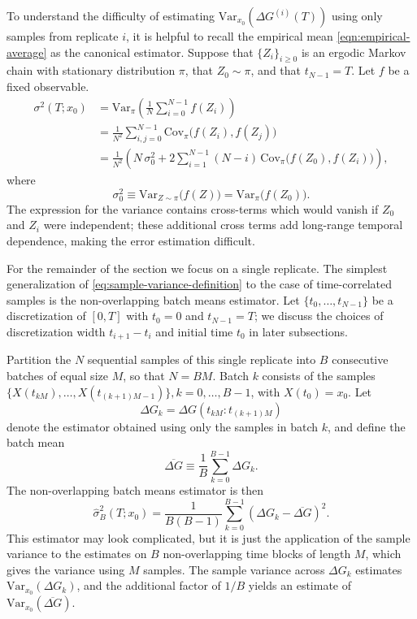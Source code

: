 \documentclass[9pt,bestpractices]{livecoms}
\begin{document}
To understand the difficulty of estimating $\mathrm{Var}_{x_0}(\Delta G^{(i)}(T))$ using only samples from replicate $i$, it is helpful to recall the empirical mean \eqref{eqn:empirical-average} as the canonical estimator. Suppose that $\{Z_i\}_{i\ge 0}$ is an ergodic Markov chain with stationary distribution $\pi$, that $Z_0 \sim \pi$, and that $t_{N-1}=T$. Let $f$ be a fixed observable. 
\begin{align}
\sigma^2(T;x_0) &= \mathrm{Var}_{\pi}\!\left(\frac{1}{N}\sum_{i=0}^{N-1} f(Z_i) \right) \\
&= \frac{1}{N^2}\sum_{i,j=0}^{N-1}
\mathrm{Cov}_{\pi}\!\bigl(f(Z_i), f(Z_j)\bigr) \\
&= \frac{1}{N^2}\left(
N\,\sigma_0^2
+ 2\sum_{i=1}^{N-1} (N-i)\,
\mathrm{Cov}_{\pi}\!\bigl(f(Z_0), f(Z_i)\bigr)
\right),
\end{align}
where
\[
\sigma_0^2 \equiv \mathrm{Var}_{Z\sim \pi}\!\bigl(f(Z)\bigr)
= \mathrm{Var}_{\pi}\!\bigl(f(Z_0)\bigr).
\]
The expression for the variance contains cross-terms which would vanish if $Z_0$ and $Z_i$ were independent; these additional cross terms add long-range temporal dependence, making the error estimation difficult. 

For the remainder of the section we focus on a single replicate. The simplest generalization of \eqref{eq:sample-variance-definition} to the case of time-correlated samples is the non-overlapping batch means estimator. Let $\{t_0,\dots,t_{N-1}\}$ be a discretization of $[0,T]$ with $t_0=0$ and $t_{N-1}=T$;  we discuss the choices of discretization width $t_{i+1} - t_i$ and initial time $t_0$ in later subsections. 

Partition the $N$ sequential samples of this single replicate into $B$ consecutive batches of equal size $M$, so that $N = BM$. Batch $k$ consists of the samples $\{X(t_{kM}),\dots,X(t_{(k+1)M-1})\}, k=0,\dots,B-1$, with $X(t_0) = x_0$. Let
\[
\Delta G_k = \Delta G(t_{kM}:t_{(k+1)M})
\]
denote the estimator obtained using only the samples in batch $k$, and define the batch mean
\[
\overline{\Delta G} \equiv \frac{1}{B}\sum_{k=0}^{B-1} \Delta G_k .
\]
The non-overlapping batch means estimator is then
\[
\hat\sigma_B^2(T;x_0)
= \frac{1}{B(B-1)}\sum_{k=0}^{B-1}
\left(\Delta G_k - \overline{\Delta G}\right)^2 .
\]
This estimator may look complicated, but it is just the application of the sample variance to the estimates on  $B$ non-overlapping time blocks of length $M$, which gives the variance using $M$ samples. The sample variance across $\Delta G_k$ estimates $\mathrm{Var}_{x_0}(\Delta G_k)$, and the additional factor of $1/B$ yields an estimate of $\mathrm{Var}_{x_0}(\overline{\Delta G})$.
\end{document}
